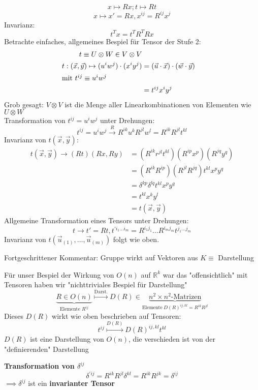 \documentclass[a4paper]{scrartcl}
\renewcommand{\v}[1]{\vec{#1}}
\theoremstyle{definition}
\theoremstyle{plain}
\theoremstyle{remark}
\theoremstyle{remark}
\begin{document}
\[x\mapsto Rx; t\mapsto Rt\]
\[x\mapsto x' = Rx, x^{ij} = R^{ij} x^j\]
Invarianz:
\[t^{T} x = t^{T} R^{T} R x\]
Betrachte einfaches, allgemeines Bespiel für Tensor der Stufe 2:
\begin{align*}
t\equiv U\otimes W \in V\otimes V \\
t:(\v x, \v y) \mapsto (u^i w^j) \cdot (x^i y^j) &= (\v u \cdot \v x) \cdot (\v w \cdot \v y) \\
\intertext{mit $t^{ij} \equiv u^i w^j$}
&= t^{ij} x^i y^j \\
\end{align*}
Grob gesagt: $V \otimes V$ ist die Menge aller Linearkombinationen von Elementen wie $U\otimes W$ \\
   Transformation von $t^{ij} = u^i w^j$ unter Drehungen:
\[t^{ij} = u^i w^j \xrightarrow{R} R^{ik} u^k R^{jl} w^l = R^{ik} R^{jl} t^{kl}\]
Invarianz von $t(\v x, \v y):$
\begin{align*}
t(\v x, \v y) \to (R t) (R x, R y) &= (R^{ik} r^{jl} t^{kl}) (R^{ip} x^p) (R^{jq} y^q) \\
&= (R^{ik} R^{ip}) (R^{jl} R^{jq}) t^{kl} x^p y^q \\
&= \delta^{kp} \delta^{lq} t^{kl} x^p y^q \\
&= t^{kl} x^{k} y^{l} \\
&= t(\v x, \v y)
\end{align*}
Allgemeine Transformation eines Tensors unter Drehungen:
\[t \to t' = Rt, t^{\prime i_1 \ldots i_m} = R^{i_1 j_1} \ldots R^{i_m j_m} t^{j_1 \ldots j_m}\]
Invarianz von $t(\v u_{(1)}, \ldots, \v u_{(m)})$ folgt wie oben.

Fortgeschrittener Kommentar: Gruppe wirkt auf Vektoren aus $K \equiv$ Darstellung

Für unser Bespiel der Wirkung von $O(n)$ auf $\mathbb{R}^k$ war das "offensichtlich" mit Tensoren haben wir "nichttriviales Bespiel für Darstellung"
\[\underbrace{R\in O(n)}_{\text{Elemente $R^{ij}$}} \overset{\text{Darst.}}{\mapsto} D(R) \in \underbrace{n^2 \times n^2 \text{-Matrizen}}_{\text{Elemente}~D(R)^{ij,kl} = R^{ik}R^{jl}}\]
Dieses $D(R)$ wirkt wie oben beschrieben auf Tensoren:
\[t^{ij} \overset{D(R)}{\mapsto} D(R)^{ij,kl} t^{kl}\]
$D(R)$ ist eine Darstellung von $O(n)$, die verschieden ist von der "definierenden" Darstellung

\textbf{Transformation von $\delta^{ij}$} \\
   \[\delta^{\prime ij} = R^{ik} R^{jl} \delta^{kl} = R^{ik} R^{jk} = \delta^{ij}\]
$\implies \delta^{ij}$ ist ein \textbf{invarianter Tensor} \\
\end{document}
